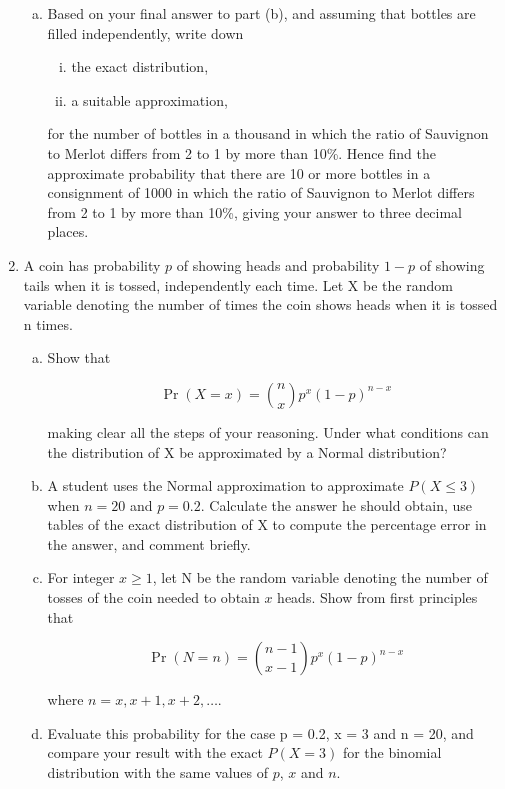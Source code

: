 \documentclass[a4paper,12pt]{article}
\begin{document}
\begin{enumerate}
\begin{enumerate}[(a)]
\item Based on your final answer to part (b), and assuming that bottles are filled
independently, write down
\begin{enumerate}[(i)]
\item the exact distribution, 
\item a suitable
approximation,
\end{enumerate} for the number of bottles in a thousand in which the ratio of
Sauvignon to Merlot differs from 2 to 1 by more than 10\%. Hence find the
approximate probability that there are 10 or more bottles in a consignment of
1000 in which the ratio of Sauvignon to Merlot differs from 2 to 1 by more
than 10\%, giving your answer to three decimal places.
\end{enumerate}



\item A coin has probability $p$ of showing heads and probability $1 − p$ of showing tails when it is tossed, independently each time.
Let X be the random variable denoting the number of times the coin shows heads when it is tossed n times.
\begin{enumerate}[(a)]
\item Show that

\[{\displaystyle \Pr(X=x)={n \choose x}p^{x}(1-p)^{n-x}}\]

making clear all the steps of your reasoning. Under what conditions can the distribution of X be approximated by a Normal distribution?



\item A student uses the Normal approximation to approximate $P(X \leq 3)$ when $n = 20$ and $p = 0.2$. Calculate the answer he should obtain, use tables of the exact distribution of X to compute the percentage error in the answer, and comment briefly.



\item For integer $x \geq 1$, let N be the random variable denoting the number of tosses of the coin needed to obtain $x$ heads. Show from first principles that


\[{\displaystyle \Pr(N=n)={n-1 \choose x-1}p^{x}(1-p)^{n-x}}\]

where $n = x,x+1,x+2, \ldots$.
\item Evaluate this probability for the case p = 0.2, x = 3 and n = 20, and compare your result with the exact $P(X = 3)$ for the binomial distribution with the same values of $p$, $x$ and $n$.

\end{enumerate}

\end{enumerate}
\end{document}
